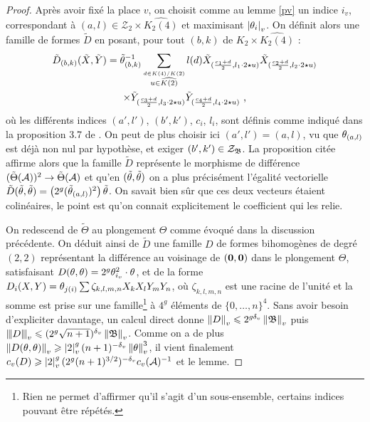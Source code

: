 \begin{proof}
  Après avoir fixé la place $v$, on choisit comme au lemme \ref{pv} un indice
  $i_v$, correspondant à $(a, l) \in \mathcal{Z}_2 \times \widehat{K_2(4)}$ et
  maximisant $\left\lvert\theta_i\right\rvert_{v}$. On définit alors une famille de formes $\tilde{D}$
  en posant, pour tout $(b, k)$ de $K_2 \times \widehat{K_2(4)}$ :
  \begin{multline*}
  \tilde{D}_{(b, k)}(\tilde{X}, \tilde{Y}) = \tilde{\theta}_{(b, k)}^{-1}
  \sum_{\stackrel{d \in K(4)/K(2)}{u \in \widehat{K(2)}}} l(d)
  \tilde{X}_{(\frac{c_1+d}{2}, l_1\cdot2\star u)}
  \tilde{X}_{(\frac{c_2+d}{2}, l_2\cdot2\star u)} \\\times
  \tilde{Y}_{(\frac{c_3+d}{2}, l_3\cdot2\star u)}
  \tilde{Y}_{(\frac{c_4+d}{2}, l_4\cdot2\star u)} \text{ ,}
  \end{multline*}
  où les différents indices $(a', l')$, $(b', k')$, $c_i$, $l_i$, sont définis
  comme indiqué dans la proposition 3.7 de \cite{daphiminvaii}. On peut de
  plus choisir ici $(a', l')= (a, l)$, vu que $\theta_{(a, l)}$ est déjà non nul
  par hypothèse, et exiger $(b', k') \in \mathcal{Z}_{\mathfrak{B}}$. La proposition
  citée affirme alors que la famille $\tilde{D}$ représente le morphisme de
  différence $(\tilde\Theta(\mathcal{A}))^2 \to \tilde\Theta(\mathcal{A})$ et qu'en
  $(\tilde{\theta}, \tilde{\theta})$ on a plus précisément l'égalité vectorielle
  $\tilde{D}(\tilde{\theta}, \tilde{\theta}) = \left( 2^g (\tilde{\theta}_{(a,
    l)})^2\right) \tilde{\theta}$. On savait bien sûr que ces deux vecteurs
  étaient colinéaires, le point est qu'on connait explicitement le coefficient
  qui les relie.

  On redescend de $\tilde\Theta$ au plongement $\Theta$ comme évoqué dans la
  discussion précédente. On déduit ainsi de $\tilde D$ une famille $D$ de
  formes bihomogènes de degré $(2, 2)$ représentant la différence au voisinage
  de $({\boldsymbol{0}}, {\boldsymbol{0}})$ dans le plongement $\Theta$, satisfaisant $D(\theta, \theta) =
  2^g \theta_{i_v}^2 \cdot \theta$, et de la forme $D_i(X, Y)= \theta_{j(i)} \sum
  \zeta_{k,l,m,n} X_kX_lY_mY_n$, où $\zeta_{k,l,m,n}$ est une racine de
  l'unité et la somme est prise sur une famille\footnote{Rien ne permet  d'affirmer qu'il s'agit d'un sous-ensemble, certains indices
  pouvant être répétés.} à $4^g$ éléments de $\{0, \dots, n\}^4$. Sans avoir
  besoin d'expliciter davantage, un calcul direct donne $\left\lVert D\right\rVert_{v} \leqslant 2^{g{\delta_v}}
  \left\lVert\mathfrak{B}\right\rVert_{v}$ puis $\left\lvert\hspace{-1pt} \left\lvert\hspace{-1pt} \left\lvert D\right\rvert \hspace{-1pt}\right\rvert \hspace{-1pt}\right\rvert_{v} \leqslant (2^g\sqrt{n+1})^{\delta_v} \left\lVert\mathfrak{B}\right\rVert_{v}$. Comme on a de plus
  $\left\lVert D(\theta, \theta)\right\rVert_{v} \geqslant \left\lvert2\right\rvert_{v}^g(n+1)^{-{\delta_v}}\left\lVert\theta\right\rVert_{v}^3$, il vient finalement
  $c_v(D) \geqslant \left\lvert2\right\rvert_{v}^g (2^g(n+1)^{3/2})^{-{\delta_v}} c_v(\mathcal{A})^{-1}$ et le lemme.
\end{proof}

